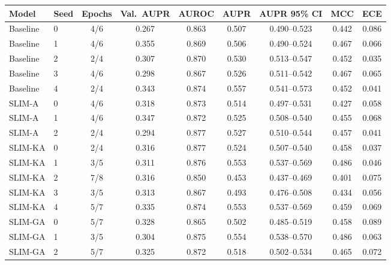 \begin{tabular}{llccccccc}
\toprule
Model & Seed & Epochs & Val.\ AUPR & AUROC & AUPR & AUPR 95\% CI & MCC & ECE \\
\midrule
Baseline & 0 & 4/6 & 0.267 & 0.863 & 0.507 & 0.490--0.523 & 0.442 & 0.086 \\
Baseline & 1 & 4/6 & 0.355 & 0.869 & 0.506 & 0.490--0.524 & 0.467 & 0.066 \\
Baseline & 2 & 2/4 & 0.307 & 0.870 & 0.530 & 0.513--0.547 & 0.452 & 0.035 \\
Baseline & 3 & 4/6 & 0.298 & 0.867 & 0.526 & 0.511--0.542 & 0.467 & 0.065 \\
Baseline & 4 & 2/4 & 0.343 & 0.874 & 0.557 & 0.541--0.573 & 0.452 & 0.041 \\
\midrule
SLIM-A & 0 & 4/6 & 0.318 & 0.873 & 0.514 & 0.497--0.531 & 0.427 & 0.058 \\
SLIM-A & 1 & 4/6 & 0.347 & 0.872 & 0.525 & 0.508--0.540 & 0.455 & 0.068 \\
SLIM-A & 2 & 2/4 & 0.294 & 0.877 & 0.527 & 0.510--0.544 & 0.457 & 0.041 \\
\midrule
SLIM-KA & 0 & 2/4 & 0.316 & 0.877 & 0.524 & 0.507--0.540 & 0.458 & 0.037 \\
SLIM-KA & 1 & 3/5 & 0.311 & 0.876 & 0.553 & 0.537--0.569 & 0.486 & 0.046 \\
SLIM-KA & 2 & 7/8 & 0.316 & 0.850 & 0.453 & 0.437--0.469 & 0.401 & 0.075 \\
SLIM-KA & 3 & 3/5 & 0.313 & 0.867 & 0.493 & 0.476--0.508 & 0.434 & 0.056 \\
SLIM-KA & 4 & 5/7 & 0.335 & 0.874 & 0.553 & 0.537--0.569 & 0.459 & 0.069 \\
\midrule
SLIM-GA & 0 & 5/7 & 0.328 & 0.865 & 0.502 & 0.485--0.519 & 0.458 & 0.089 \\
SLIM-GA & 1 & 3/5 & 0.304 & 0.875 & 0.554 & 0.538--0.570 & 0.486 & 0.063 \\
SLIM-GA & 2 & 5/7 & 0.325 & 0.872 & 0.518 & 0.502--0.534 & 0.465 & 0.072 \\
\bottomrule
\end{tabular}

